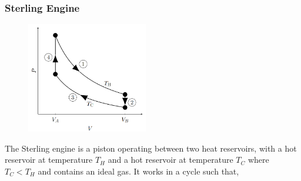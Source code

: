 \documentclass{book}
\begin{document}
\subsubsection{Sterling Engine}
\begin{figure}
	\centering
	\includegraphics[width=200px]{heatengine.png}
	\caption{} \label{fig:heat engine}
\end{figure}
The Sterling engine is a piston operating between two heat reservoirs, with a hot reservoir at temperature $T_H$ and a hot reservoir at temperature $T_C$ where $T_C < T_H$ and contains an ideal gas. It works in a cycle such that,
\end{document}
